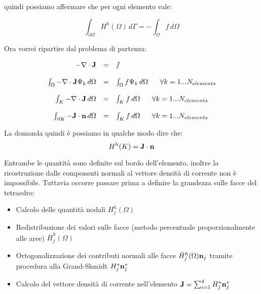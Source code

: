 quindi possiamo affermare che per ogni elemento vale:

\begin{equation}
\int_{\partial\Omega}H^h(\Omega) \, d\Gamma =  - \int_\Omega f \, d\Omega
\end{equation}

Ora vorrei ripartire dal problema di partenza:

\begin{equation}
\begin{array}{rcl}
-\nabla \cdot \vect{J} & = & f \\
\\
\int_\Omega -\nabla \cdot \vect{J} \Psi_k \, d\Omega & = & 
\int_\Omega f \Psi_k \, d\Omega  \psp{10}  \forall k = 1 ... N_{elements}\\
\\
\int_K -\nabla \cdot \vect{J} \, d\Omega & = & \int_K f \, d\Omega  \psp{10}  \forall k = 1 ... N_{elements}\\
\\
\int_{\partial K} -\vect{J} \cdot \vect{n} \, d\Omega & = & \int_K f \, d\Omega  \psp{10}  \forall k = 1 ... N_{elements}\\

\end{array}
\end{equation}

La domanda quindi \`e possiamo in qualche modo dire che:
\begin{equation}
H^h(K) = \mathbf{J}\cdot \mathbf{n} 
\end{equation}

Entrambe le quantit\`a sono definite sul bordo dell'elemento, inoltre la ricostruzione dalle componenti normali al vettore densit\`a di corrente non \`e impossibile.
Tuttavia occorre passare prima a definire la grandezza sulle facce del tetraedro:
\begin{itemize}
\item Calcolo delle quantit\`a nodali $H^h_j(\Omega)$
\item Redistribuzione dei valori sulle facce (metodo percentuale proporzionalmente alle aree) $\bar{H}^h_j(\Omega)$
\item Ortogonalizzazione dei contributi normali alle facce $\bar{H}^h_j(\Omega) \mathbf{n}_j$ tramite procedura alla Grand-Shmidt $H^*_j \mathbf{n}_j^*$
\item Calcolo del vettore densit\`a di corrente nell'elemento $\mathbf{J}=\sum_{i=1}^4 H^*_j\mathbf{n}_j^*$
\end{itemize}
